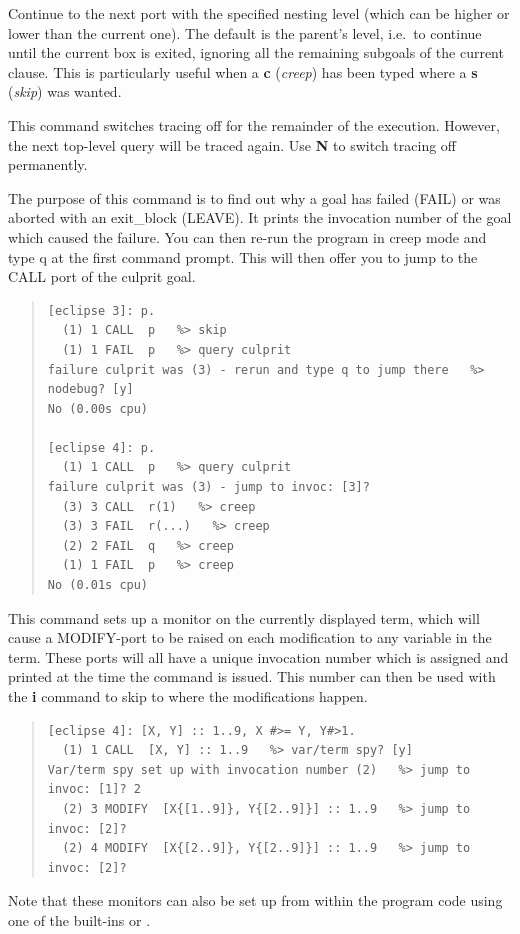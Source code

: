 \begin{descr}{1cm}
Continue to the next port with the specified nesting level (which can
be higher or lower than the current one).
The default is the parent's level, i.e.\ to continue until the current
box is exited, ignoring all the remaining subgoals of the current clause.
This is particularly useful when a {\bf c} ({\it creep}) has been
typed where a {\bf s} ({\it skip}) was wanted.

This command switches tracing off for the remainder of the execution.
However, the next top-level query will be traced again.
Use {\bf N} to switch tracing off permanently.

The purpose of this command is to find out why a goal has failed (FAIL)
or was aborted with an exit_block (LEAVE).  It prints the invocation
number of the goal which caused the failure.  You can then re-run the
program in creep mode and type q at the first command prompt.  This will
then offer you to jump to the CALL port of the culprit goal.
\begin{quote}\begin{verbatim}
[eclipse 3]: p.
  (1) 1 CALL  p   %> skip
  (1) 1 FAIL  p   %> query culprit
failure culprit was (3) - rerun and type q to jump there   %> nodebug? [y] 
No (0.00s cpu)

[eclipse 4]: p.
  (1) 1 CALL  p   %> query culprit
failure culprit was (3) - jump to invoc: [3]? 
  (3) 3 CALL  r(1)   %> creep
  (3) 3 FAIL  r(...)   %> creep
  (2) 2 FAIL  q   %> creep
  (1) 1 FAIL  p   %> creep
No (0.01s cpu)
\end{verbatim}\end{quote}

This command sets up a monitor on the currently displayed term,
which will cause a MODIFY-port to be raised on each modification to
any variable in the term. These ports will all have a unique invocation
number which is assigned and printed at the time the command is issued.
This number can then be used with the {\bf i} command to skip to where
the modifications happen.
\begin{quote}\begin{verbatim}
[eclipse 4]: [X, Y] :: 1..9, X #>= Y, Y#>1.
  (1) 1 CALL  [X, Y] :: 1..9   %> var/term spy? [y] 
Var/term spy set up with invocation number (2)   %> jump to invoc: [1]? 2
  (2) 3 MODIFY  [X{[1..9]}, Y{[2..9]}] :: 1..9   %> jump to invoc: [2]? 
  (2) 4 MODIFY  [X{[2..9]}, Y{[2..9]}] :: 1..9   %> jump to invoc: [2]? 
\end{verbatim}\end{quote}
Note that these monitors can also be set
up from within the program code using one of the built-ins
 or
.


\end{descr}

